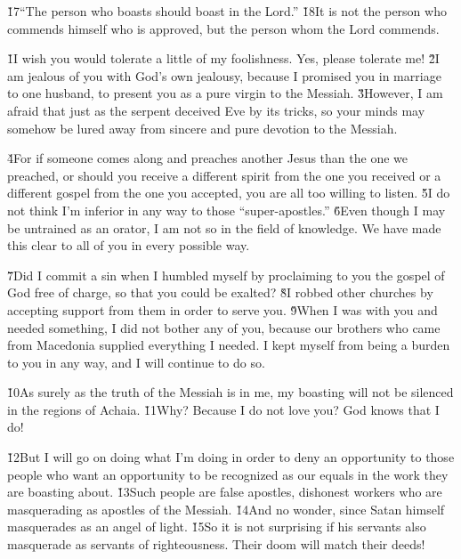 \v{17}``The person who boasts should boast in the Lord.'' \v{18}It is not the person who commends himself who is approved, but the person whom the Lord commends.

\v{1}I wish you would tolerate a little of my foolishness. Yes, please tolerate me! \v{2}I am jealous of you with God's own jealousy, because I promised you in marriage to one husband, to present you as a pure virgin to the Messiah. \v{3}However, I am afraid that just as the serpent deceived Eve by its tricks, so your minds may somehow be lured away from sincere and pure devotion to the Messiah.

\v{4}For if someone comes along and preaches another Jesus than the one we preached, or should you receive a different spirit from the one you received or a different gospel from the one you accepted, you are all too willing to listen. \v{5}I do not think I'm inferior in any way to those ``super-apostles.'' \v{6}Even though I may be untrained as an orator, I am not so in the field of knowledge. We have made this clear to all of you in every possible way.

\v{7}Did I commit a sin when I humbled myself by proclaiming to you the gospel of God free of charge, so that you could be exalted? \v{8}I robbed other churches by accepting support from them in order to serve you. \v{9}When I was with you and needed something, I did not bother any of you, because our brothers who came from Macedonia supplied everything I needed. I kept myself from being a burden to you in any way, and I will continue to do so.

\v{10}As surely as the truth of the Messiah is in me, my boasting will not be silenced in the regions of Achaia. \v{11}Why? Because I do not love you? God knows that I do!

\v{12}But I will go on doing what I'm doing in order to deny an opportunity to those people who want an opportunity to be recognized as our equals in the work they are boasting about. \v{13}Such people are false apostles, dishonest workers who are masquerading as apostles of the Messiah. \v{14}And no wonder, since Satan himself masquerades as an angel of light. \v{15}So it is not surprising if his servants also masquerade as servants of righteousness. Their doom will match their deeds!

